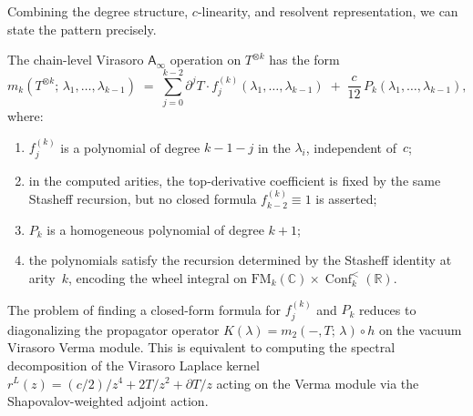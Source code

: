 \documentclass[11pt]{article}
\newcommand{\C}{\mathbb{C}}
\newcommand{\R}{\mathbb{R}}
\newcommand{\Ainf}{\mathsf{A}_{\infty}}
\newcommand{\FM}{\mathrm{FM}}
\DeclareMathOperator{\Conf}{Conf}
\begin{document}
Combining the degree structure, $c$-linearity, and resolvent
representation, we can state the pattern precisely.

\begin{conjecture}\label{conj:closed-form-wn}
The chain-level Virasoro $\Ainf$ operation on $T^{\otimes k}$ has
the form
\begin{equation}\label{eq:mk-pattern-wn}
m_k(T^{\otimes k};\,\lambda_1, \ldots, \lambda_{k-1})
\;=\;
\sum_{j=0}^{k-2}
\partial^j T \cdot
f_j^{(k)}(\lambda_1, \ldots, \lambda_{k-1})
\;+\;
\frac{c}{12}\,P_k(\lambda_1, \ldots, \lambda_{k-1}),
\end{equation}
where:
\begin{enumerate}[label=\textup{(\alph*)},nosep]
\item $f_j^{(k)}$ is a polynomial of degree $k-1-j$ in the
  $\lambda_i$, independent of~$c$;
\item in the computed arities, the top-derivative coefficient is
  fixed by the same Stasheff recursion, but no closed formula
  $f_{k-2}^{(k)}\equiv 1$ is asserted;
\item $P_k$ is a homogeneous polynomial of degree $k+1$;
\item the polynomials satisfy the recursion determined by the
  Stasheff identity at arity~$k$, encoding the wheel integral
  on $\FM_k(\C) \times \Conf_k^{<}(\R)$.
\end{enumerate}

The problem of finding a closed-form formula for $f_j^{(k)}$ and
$P_k$ reduces to diagonalizing the propagator operator
$K(\lambda) = m_2(-, T;\, \lambda) \circ h$
on the vacuum Virasoro Verma module.  This is equivalent to
computing the spectral decomposition of the Virasoro
Laplace kernel $r^L(z) = (c/2)/z^4 + 2T/z^2 + \partial T/z$
acting on the Verma module via the Shapovalov-weighted adjoint
action.
\end{conjecture}
\end{document}
